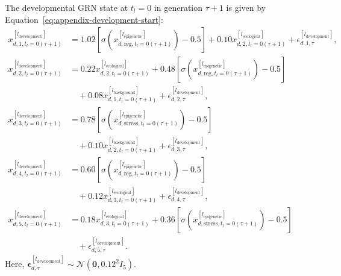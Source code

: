 \documentclass[11pt]{article}
\begin{document}
The developmental GRN state at $t_l=0$ in generation $\tau+1$ is given by Equation~\ref{eq:appendix-development-start}:
\begin{equation}
\begin{aligned}
x^{[l_{\mathrm{development}}]}_{d,1,t_l=0(\tau+1)}
&=1.02\!\left[
\sigma\!\left(x^{[l_{\mathrm{epigenetic}}]}_{d,\mathrm{reg},t_l=0(\tau+1)}\right)-0.5
\right]
+0.10x^{[l_{\mathrm{ecological}}]}_{d,2,t_l=0(\tau+1)}
+\epsilon^{[l_{\mathrm{development}}]}_{d,1,\tau},\\
x^{[l_{\mathrm{development}}]}_{d,2,t_l=0(\tau+1)}
&=0.22x^{[l_{\mathrm{ecological}}]}_{d,2,t_l=0(\tau+1)}
+0.48\!\left[
\sigma\!\left(x^{[l_{\mathrm{epigenetic}}]}_{d,\mathrm{reg},t_l=0(\tau+1)}\right)-0.5
\right]\\
&\quad
+0.08x^{[l_{\mathrm{background}}]}_{d,1,t_l=0(\tau+1)}
+\epsilon^{[l_{\mathrm{development}}]}_{d,2,\tau},\\
x^{[l_{\mathrm{development}}]}_{d,3,t_l=0(\tau+1)}
&=0.78\!\left[
\sigma\!\left(x^{[l_{\mathrm{epigenetic}}]}_{d,\mathrm{stress},t_l=0(\tau+1)}\right)-0.5
\right]\\
&\quad
+0.10x^{[l_{\mathrm{background}}]}_{d,2,t_l=0(\tau+1)}
+\epsilon^{[l_{\mathrm{development}}]}_{d,3,\tau},\\
x^{[l_{\mathrm{development}}]}_{d,4,t_l=0(\tau+1)}
&=0.60\!\left[
\sigma\!\left(x^{[l_{\mathrm{epigenetic}}]}_{d,\mathrm{reg},t_l=0(\tau+1)}\right)-0.5
\right]\\
&\quad
+0.12x^{[l_{\mathrm{ecological}}]}_{d,3,t_l=0(\tau+1)}
+\epsilon^{[l_{\mathrm{development}}]}_{d,4,\tau},\\
x^{[l_{\mathrm{development}}]}_{d,5,t_l=0(\tau+1)}
&=0.18x^{[l_{\mathrm{ecological}}]}_{d,3,t_l=0(\tau+1)}
+0.36\!\left[
\sigma\!\left(x^{[l_{\mathrm{epigenetic}}]}_{d,\mathrm{stress},t_l=0(\tau+1)}\right)-0.5
\right]\\
&\quad
+\epsilon^{[l_{\mathrm{development}}]}_{d,5,\tau}.
\end{aligned}
\label{eq:appendix-development-start}
\end{equation}
Here, $\boldsymbol{\epsilon}^{[l_{\mathrm{development}}]}_{d,\tau}\sim\mathcal{N}(\mathbf{0},0.12^2I_5)$.
\end{document}
